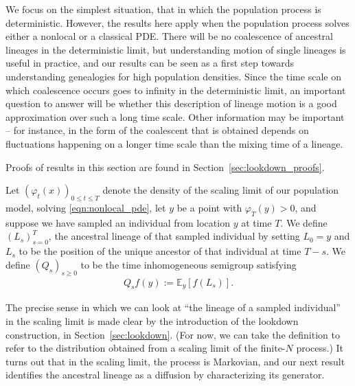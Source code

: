 \documentclass[EJP]{ejpecp} %
\newcommand{\IE}{\mathbb E}
\newcommand{\citet}[1]{\cite{#1}}
\begin{document}
We focus on the simplest situation, that in which the population process is deterministic.
However, the results here apply when the population process solves 
either a nonlocal or a classical PDE.
There will be no coalescence of ancestral lineages in the deterministic limit,
but understanding motion of single lineages is useful in practice,
and our results can
be seen as a first step towards understanding genealogies for high population densities. 
Since the time scale on which coalescence occurs 
goes to infinity in the deterministic limit,
an important question to answer will be whether this description of lineage motion
is a good approximation over such a long time scale.
Other information may be important -- for instance, in \citet{etheridge/pennington:2022}
the form of the coalescent that is obtained depends
on fluctuations happening on a longer time scale than the mixing time of a lineage.

Proofs of results in this section are found in Section~\ref{sec:lookdown_proofs}.

\begin{definition} 
\label{def:lineage_generator}
    Let $(\varphi_t(x))_{0 \le t \le T}$
    denote the density of the scaling limit of our population model, 
solving \eqref{eqn:nonlocal_pde},
    let $y$ be a point with $\varphi_T(y) > 0$,
    and suppose we have sampled an individual from location $y$ at time $T$.
    We define $(L_s)_{s=0}^T$,
    the ancestral lineage of that sampled individual by setting $L_0=y$
    and $L_s$ to be the position of the unique ancestor of that individual at time $T - s$.
    We define
    $(Q_s)_{s \geq 0}$
    to be the time inhomogeneous semigroup satisfying
    \begin{align*}
        Q_s f(y) := \IE_y[ f(L_s) ] .
    \end{align*}
\end{definition}

The precise sense in which we can look at ``the lineage of a sampled individual'' 
in the scaling limit is made clear by the introduction of the lookdown construction,
in Section~\ref{sec:lookdown}.
(For now, we can take the definition to refer to the distribution obtained
from a scaling limit of the finite-$N$ process.)
It turns out that in the scaling limit,
the process is Markovian,
and our next result identifies the ancestral lineage as a diffusion
by characterizing its generator.
\end{document}
